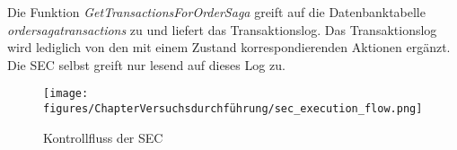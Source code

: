 Die Funktion \textit{GetTransactionsForOrderSaga} greift auf die Datenbanktabelle \textit{ordersagatransactions} zu und liefert das Transaktionslog. Das Transaktionslog wird lediglich von den mit einem Zustand korrespondierenden Aktionen ergänzt. Die SEC selbst greift nur lesend auf dieses Log zu.

\begin{figure}[H]
	\centering
	\texttt{[image: figures/ChapterVersuchsdurchführung/sec\_execution\_flow.png]}
	\caption{Kontrollfluss der SEC}
	\label{fig:sequence_diagramm_sec_control_flow}
\end{figure}
\FloatBarrier
